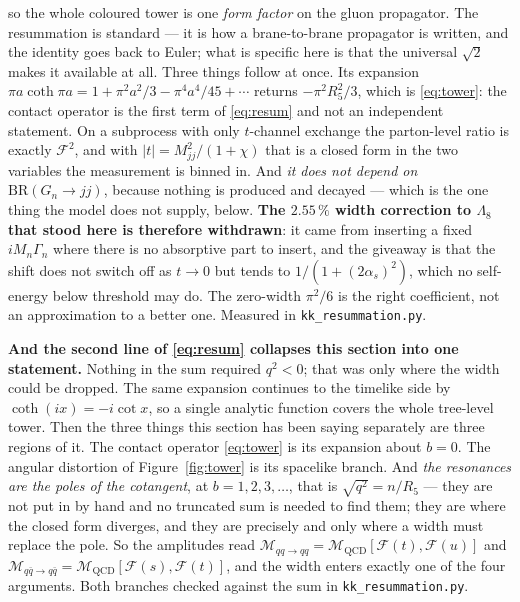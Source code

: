 \documentclass[11pt,a4paper]{article}
\begin{document}
\noindent so the whole coloured tower is one \emph{form factor} on the gluon propagator. The
resummation is standard --- it is how a brane-to-brane propagator is written, and the identity goes
back to Euler; what is specific here is that the universal $\sqrt2$ makes it available at all. Three
things follow at once. Its expansion $\pi a\coth\pi a=1+\pi^2a^2/3-\pi^4a^4/45+\cdots$ returns
$-\pi^2R_5^2/3$, which is \eqref{eq:tower}: the contact operator is the first term of
\eqref{eq:resum} and not an independent statement. On a subprocess with only $t$-channel exchange
the parton-level ratio is exactly $\mathcal F^2$, and with $|t|=M_{jj}^2/(1+\chi)$ that is a closed
form in the two variables the measurement is binned in. And \emph{it does not depend on
$\mathrm{BR}(G_n\to jj)$}, because nothing is produced and decayed --- which is the one thing the
model does not supply, below. \textbf{The $2.55\,\%$ width correction to $\Lambda_8$ that stood
here is therefore withdrawn}: it came from inserting a fixed $iM_n\Gamma_n$ where there is no
absorptive part to insert, and the giveaway is that the shift does not switch off as $t\to0$ but
tends to $1/(1+(2\alpha_s)^2)$, which no self-energy below threshold may do. The zero-width
$\pi^2/6$ is the right coefficient, not an approximation to a better one. Measured in
\texttt{kk\_\allowbreak resummation.py}.

\noindent\textbf{And the second line of \eqref{eq:resum} collapses this section into one
statement.} Nothing in the sum required $q^2<0$; that was only where the width could be dropped.
The same expansion continues to the timelike side by $\coth(ix)=-i\cot x$, so a single analytic
function covers the whole tree-level tower. Then the three things this section has been saying
separately are three regions of it. The contact operator \eqref{eq:tower} is its expansion about
$b=0$. The angular distortion of Figure~\ref{fig:tower} is its spacelike branch. And \emph{the
resonances are the poles of the cotangent}, at $b=1,2,3,\dots$, that is $\sqrt{q^2}=n/R_5$ ---
they are not put in by hand and no truncated sum is needed to find them; they are where the closed
form diverges, and they are precisely and only where a width must replace the pole. So the
amplitudes read $\mathcal M_{qq\to qq}=\mathcal M_{\mathrm{QCD}}[\mathcal F(t),\mathcal F(u)]$ and
$\mathcal M_{q\bar q\to q\bar q}=\mathcal M_{\mathrm{QCD}}[\mathcal F(s),\mathcal F(t)]$, and the
width enters exactly one of the four arguments. Both branches checked against the sum in
\texttt{kk\_\allowbreak resummation.py}.
\end{document}
